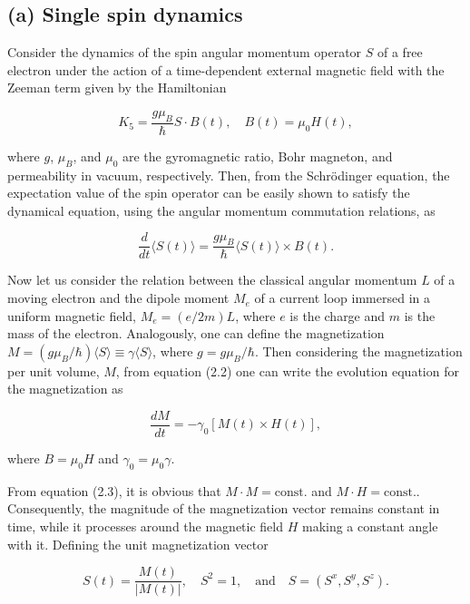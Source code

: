 \documentclass{article}
\begin{document}
	\subsection*{(a) Single spin dynamics}
	Consider the dynamics of the spin angular momentum operator $S$ of a free electron under the action of a time-dependent external magnetic field with the Zeeman term given by the Hamiltonian
	
	\begin{equation}
	K_5 = \frac{g\mu_B}{\hbar} S \cdot B(t), \quad B(t) = \mu_0 H(t),
	\end{equation}
	
	where $g$, $\mu_B$, and $\mu_0$ are the gyromagnetic ratio, Bohr magneton, and permeability in vacuum, respectively. Then, from the Schrödinger equation, the expectation value of the spin operator can be easily shown to satisfy the dynamical equation, using the angular momentum commutation relations, as
	
	\begin{equation}
	\frac{d}{dt} \langle S(t) \rangle = \frac{g\mu_B}{\hbar} \langle S(t) \rangle \times B(t).
	\end{equation}
	
	Now let us consider the relation between the classical angular momentum $L$ of a moving electron and the dipole moment $M_e$ of a current loop immersed in a uniform magnetic field, $M_e = (e/2m) L$, where $e$ is the charge and $m$ is the mass of the electron. Analogously, one can define the magnetization $M = (g\mu_B/\hbar)\langle S \rangle \equiv \gamma \langle S \rangle$, where $g = g\mu_B/\hbar$. Then considering the magnetization per unit volume, $M$, from equation (2.2) one can write the evolution equation for the magnetization as
	
	\begin{equation}
	\frac{dM}{dt} = -\gamma_0 [M(t) \times H(t)],
	\end{equation}
	
	where $B = \mu_0 H$ and $\gamma_0 = \mu_0 \gamma$.
	
	From equation (2.3), it is obvious that $M \cdot M = \text{const.}$ and $M \cdot H = \text{const.}$. Consequently, the magnitude of the magnetization vector remains constant in time, while it processes around the magnetic field $H$ making a constant angle with it. Defining the unit magnetization vector
	
	\begin{equation}
	S(t) = \frac{M(t)}{|M(t)|}, \quad S^2 = 1, \quad \text{and} \quad S = (S^x, S^y, S^z).
	\end{equation}
\end{document}
